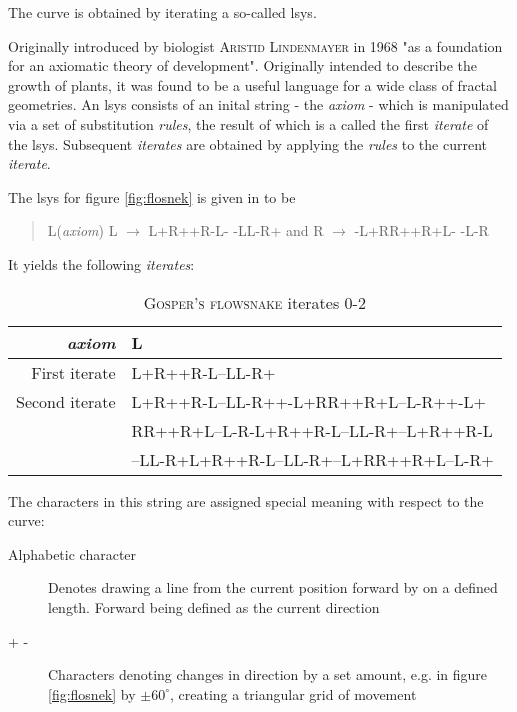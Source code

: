 The curve is obtained by iterating a so-called \gls{lsys}.

Originally introduced by biologist \textsc{Aristid Lindenmayer} in 1968 "as a foundation for an axiomatic theory of development"\citep[Preface]{Prusinkiewicz2013}. Originally intended to describe the growth of plants, it was found to be a useful language for a wide class of fractal geometries.
An \gls{lsys} consists of an inital string - the \textit{\gls{axiom}} - which is manipulated via a set of substitution \textit{rules}, the result of which is a called the first \textit{iterate} of the \gls{lsys}. Subsequent \textit{iterates} are obtained by applying the \textit{rules} to the current \textit{iterate}.

The \gls{lsys} for figure \ref{fig:flosnek} is given in \citet[p.7]{Arndt2016} to be 
\begin{quote}
	\centering
	L(\textit{axiom}) \quad L $\rightarrow$ L+R++R-L- -LL-R+ \quad and \quad R $\rightarrow$ -L+RR++R+L- -L-R
\end{quote}

It yields the following \textit{iterates}:\\
\begin{table}[htb]
\begin{tabular}{r|l}\hline
\textit{\gls{axiom}}& L\\\hline
First iterate 	& L+R++R-L--LL-R+\\\hline
Second iterate 	& L+R++R-L--LL-R++-L+RR++R+L--L-R++-L+\\
		& RR++R+L--L-R-L+R++R-L--LL-R+--L+R++R-L\\
		& --LL-R+L+R++R-L--LL-R+--L+RR++R+L--L-R+\\\hline
\end{tabular}\label{desc:lsysit}
\caption{\textsc{Gosper's flowsnake} iterates 0-2}
\end{table}

The characters in this string are assigned special meaning with respect to the curve:
\begin{description}
	\item[Alphabetic character] Denotes drawing a line from the current position forward by on a defined length. Forward being defined as the current direction
	\item[+ -] Characters denoting changes in direction by a set amount, e.g. in figure \ref{fig:flosnek} by $\pm60^\circ$, creating a triangular grid of movement
\end{description}

